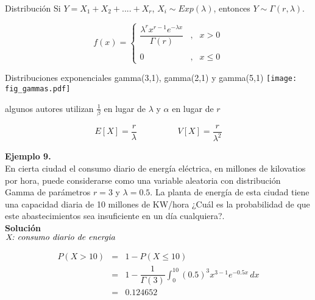 \documentclass[base=hide,12pt]{elegantbook}
\begin{document}
\begin{Box2}{Distribución }
	Si $Y=X_{1}+X_{2}+....+X_{r}$, $X_{i} \sim Exp(\lambda)$, entonces $Y \sim \Gamma(r,\lambda)$.
	
	
	\begin{equation*}
		f(x)=\left\lbrace
		\begin{array}{lll}
			\dfrac{\lambda^{r}x^{r-1} e^{-\lambda x}}{\Gamma(r)}  &,& x > 0   \\
			&&\\
			0 &,&   x \leq 0
		\end{array}
		\right.
	\end{equation*}
	
	
	
\end{Box2}
\begin{center}
	Distribuciones exponenciales \textcolor{col4}{gamma(3,1)}, \textcolor{col5}{gamma(2,1)} y \textcolor{col3}{gamma(5,1)}
	\texttt{[image: fig\_gammas.pdf]}
\end{center}

\noindent algunos autores utilizan $\frac{1}{\beta}$ en lugar de $\lambda$ y $\alpha$ en lugar de $r$

$$E[X]=\dfrac{r}{\lambda}  \hspace{2cm} V[X]= \dfrac{r}{\lambda^{2}}$$


\vspace{.5cm} 
\textcolor{col3}{\bf \large Ejemplo 9.}\\
En cierta ciudad el consumo diario de energía eléctrica, en millones de kilovatios por hora, puede considerarse como una variable aleatoria con distribución Gamma de parámetros $r= 3$ y $\lambda= 0.5$. La planta de energía de esta ciudad tiene una capacidad diaria de 10 millones de KW/hora
¿Cuál es la probabilidad de que este abastecimientos sea insuficiente en un día cualquiera?.\\

\textcolor{col3}{\bf \large Solución }\\
$\emph{X: consumo diario de energia}$

\begin{eqnarray*}
	P(X > 10)&=& 1-P(X \leq 10) \\
	&=& 1 - \dfrac{1}{\Gamma(3)} \int_{0}^{10} (0.5)^{3}  x^{3-1} e^{-0.5x} \,dx \\
	&=& 0.124652
\end{eqnarray*}
\end{document}
